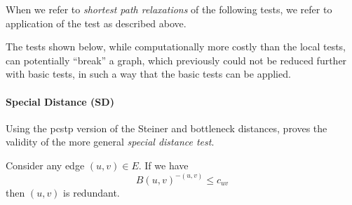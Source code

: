 When we refer to
\textit{shortest path relaxations} of the following tests, we refer to application of the test
 as described above.

 The tests shown below, while computationally more costly than the local tests, can potentially
 ``break'' a graph, which previously could not be reduced further with basic tests, in such a
 way that the basic tests can be applied.
 \paragraph{Special Distance (SD)}\label{sec:red:test:sd}
 Using the \gls{pcstp} version of the Steiner and bottleneck distances,
 \citet{uchoa2006reduction} proves
  the validity of the more general \textit{special distance test}.
 \begin{theorem}
 Consider any edge $(u,v) \in E$. If we have
 $${B(u,v)}^{-(u,v)} \leq c_{uv}$$
 then $(u,v)$ is redundant.
\end{theorem}
